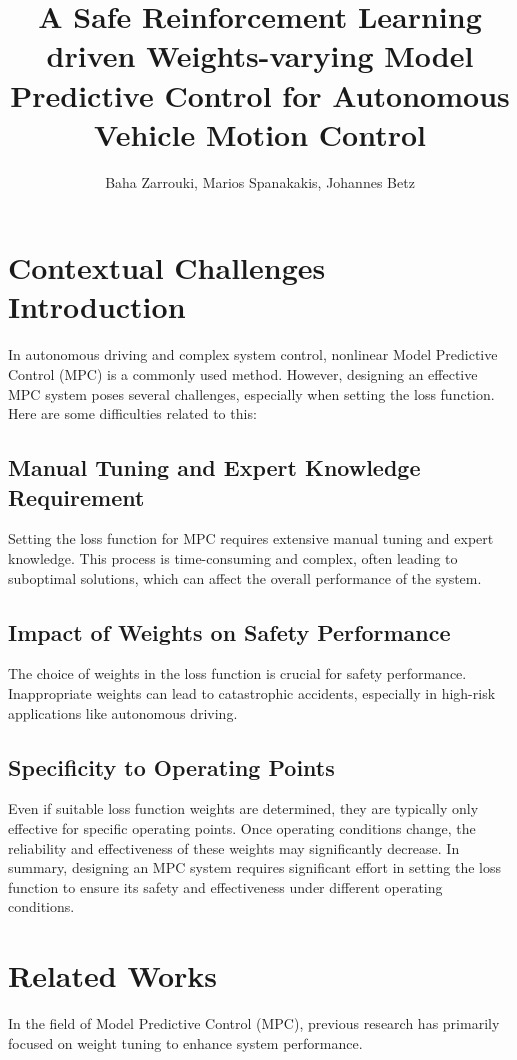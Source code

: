 \documentclass[9pt,a4paper,twocolumn,twoside]{tau-class/tau}
\title{A Safe Reinforcement Learning driven Weights-varying Model Predictive Control for Autonomous Vehicle Motion Control}
\author{Baha Zarrouki, Marios Spanakakis, Johannes Betz}
\begin{document}
		
    \maketitle 
    \thispagestyle{firststyle} 
    \tauabstract 
    

\section{Contextual Challenges Introduction}
	In autonomous driving and complex system control, nonlinear Model Predictive Control (MPC) is a commonly used method. However, designing an effective MPC system poses several challenges, especially when setting the loss function. Here are some difficulties related to this:
	\subsection{Manual Tuning and Expert Knowledge Requirement}
	Setting the loss function for MPC requires extensive manual tuning and expert knowledge. This process is time-consuming and complex, often leading to suboptimal solutions, which can affect the overall performance of the system.
	\subsection{Impact of Weights on Safety Performance}
	The choice of weights in the loss function is crucial for safety performance. Inappropriate weights can lead to catastrophic accidents, especially in high-risk applications like autonomous driving.
	\subsection{Specificity to Operating Points}
	Even if suitable loss function weights are determined, they are typically only effective for specific operating points. Once operating conditions change, the reliability and effectiveness of these weights may significantly decrease.
	In summary, designing an MPC system requires significant effort in setting the loss function to ensure its safety and effectiveness under different operating conditions.

\section{Related Works}
In the field of Model Predictive Control (MPC), previous research has primarily focused on weight tuning to enhance system performance.
\end{document}
